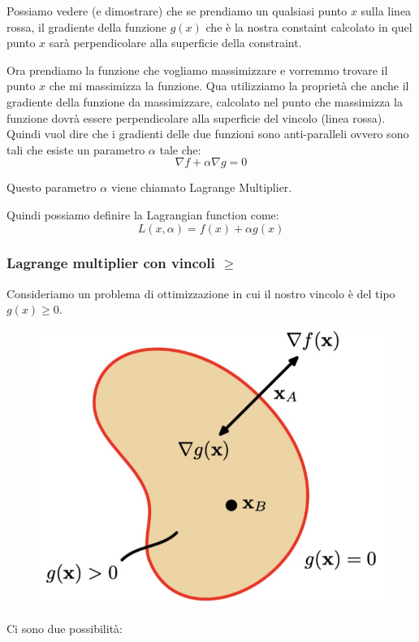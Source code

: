 \documentclass[14pt]{extreport}
\begin{document}
Possiamo vedere (e dimostrare) che se prendiamo un qualsiasi punto $x$ sulla linea rossa, il gradiente della funzione $g(x)$ che è la nostra constaint
calcolato in quel punto $x$ sarà perpendicolare alla superficie della constraint.

Ora prendiamo la funzione che vogliamo massimizzare e vorremmo trovare il punto $x$ che mi massimizza la funzione. Qua utilizziamo la proprietà che
anche il gradiente della funzione da massimizzare, calcolato nel punto che massimizza la funzione dovrà essere perpendicolare alla superficie del
vincolo (linea rossa). Quindi vuol dire che i gradienti delle due funzioni sono anti-paralleli ovvero sono tali che esiste un parametro $\alpha$ tale
che: $$\nabla f + \alpha \nabla g = 0$$

Questo parametro $\alpha$ viene chiamato Lagrange Multiplier.

Quindi possiamo definire la Lagrangian function come: $$L(x, \alpha) = f(x) + \alpha g(x)$$

\subsubsection{Lagrange multiplier con vincoli $\geq$}

Consideriamo un problema di ottimizzazione in cui il nostro vincolo è del tipo $g(x) \geq 0$.

\begin{figure}[H]
\centering
\includegraphics[width=0.5\linewidth]{349.jpeg}
\end{figure}

Ci sono due possibilità:
\end{document}

